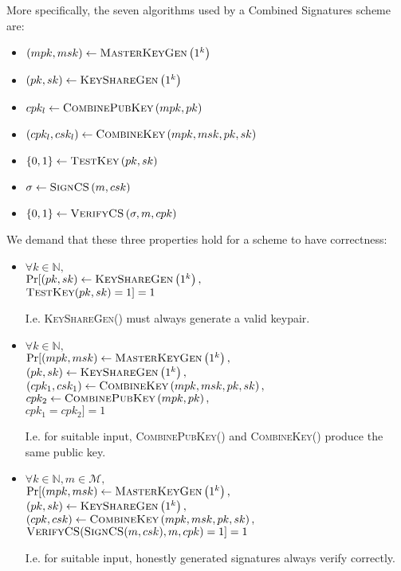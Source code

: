   More specifically, the seven algorithms used by a Combined Signatures
  scheme are:
  \begin{itemize}
    \item $\left(mpk, msk\right) \gets \textsc{MasterKeyGen}\left(1^k\right)$
    \item $\left(pk, sk\right) \gets \textsc{KeyShareGen}\left(1^k\right)$
    \item $cpk_l \gets \textsc{CombinePubKey}\left(mpk, pk\right)$
    \item $\left(cpk_l, csk_l\right) \gets \textsc{CombineKey}\left(mpk,
    msk, pk, sk\right)$
    \item $\{0, 1\} \gets \textsc{TestKey}\left(pk, sk\right)$
    \item $\sigma \gets \textsc{SignCS}\left(m, csk\right)$
    \item $\left\{0, 1\right\} \gets \textsc{VerifyCS}\left(\sigma, m,
    cpk\right)$
  \end{itemize}
  We demand that these three properties hold for a scheme to have
  correctness:
  \begin{itemize}
    \item $\forall k \in \mathbb{N},$ \\
    $\Pr[\left(pk, sk\right) \gets \textsc{KeyShareGen}\left(1^k\right),$ \\
    $\textsc{TestKey}(pk, sk) = 1] = 1$

    I.e. \textsc{KeyShareGen}() must always generate a valid keypair.

    \item $\forall k \in \mathbb{N},$ \\
    $\Pr[(mpk, msk) \gets \textsc{MasterKeyGen}\left(1^k\right),$ \\
    $\left(pk, sk\right) \gets \textsc{KeyShareGen}\left(1^k\right),$ \\
    $\left(cpk_1, csk_1\right) \gets \textsc{CombineKey}\left(mpk, msk, pk,
    sk\right),$ \\
    $cpk_2 \gets \textsc{CombinePubKey}\left(mpk, pk\right),$ \\
    $cpk_1 = cpk_2] = 1$

    I.e. for suitable input, \textsc{CombinePubKey}() and
    \textsc{CombineKey}() produce the same public key.

    \item $\forall k \in \mathbb{N}, m \in \mathcal{M},$ \\
    $\Pr[(mpk, msk) \gets \textsc{MasterKeyGen}\left(1^k\right),$ \\
    $\left(pk, sk\right) \gets \textsc{KeyShareGen}\left(1^k\right),$ \\
    $\left(cpk, csk\right) \gets \textsc{CombineKey}\left(mpk, msk, pk,
    sk\right),$ \\
    $\textsc{VerifyCS}(\textsc{SignCS}(m, csk), m, cpk) = 1] = 1$

    I.e. for suitable input, honestly generated signatures always verify
    correctly.
  \end{itemize}

